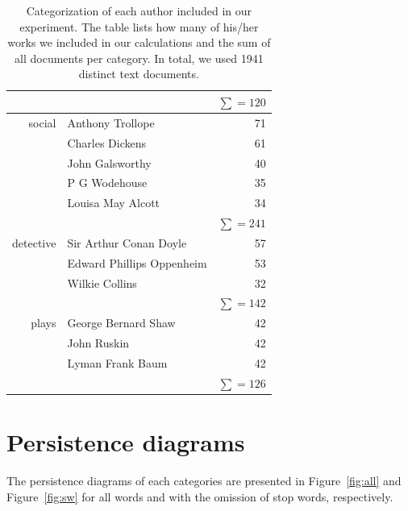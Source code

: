 \documentclass[fleqn]{article}
\begin{document}
\begin{table}[ht]
\begin{tabular}{r|l|r}
        & & $\sum = 120$ \\
        \hline
        social & Anthony Trollope & 71 \\
        & Charles Dickens & 61 \\
        & John Galsworthy & 40 \\
        & P G Wodehouse & 35 \\
        & Louisa May Alcott & 34 \\
        & & $\sum = 241$ \\
        \hline
        detective & Sir Arthur Conan Doyle & 57 \\
        & Edward Phillips Oppenheim & 53 \\
        & Wilkie Collins & 32 \\
        & & $\sum = 142$ \\
        \hline
        plays & George Bernard Shaw & 42 \\
        & John Ruskin & 42 \\
        & Lyman Frank Baum & 42 \\
        & & $\sum = 126$ \\
    \end{tabular}
    \caption{Categorization of each author included in our experiment. The table lists how many of his/her works we included in our calculations and the sum of all documents per category. In total, we used 1941 distinct text documents.}
    \label{tab:1}
\end{table}

\section{Persistence diagrams} \label{app:persistence}
The persistence diagrams of each categories are presented in Figure~\ref{fig:all} and Figure~\ref{fig:sw} for all words and with the omission of stop words, respectively.
\end{document}
